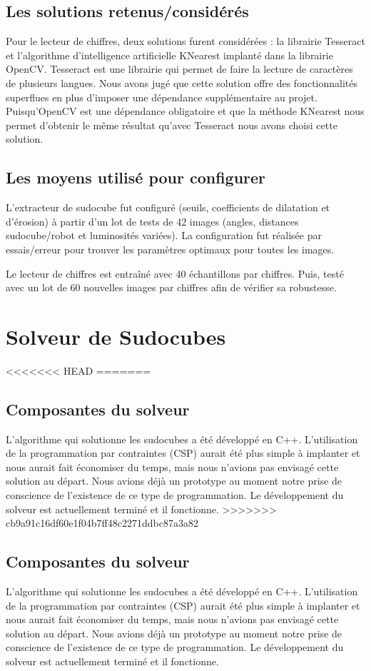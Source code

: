\subsection{Les solutions retenus/considérés}
Pour le lecteur de chiffres, deux solutions furent considérées : la librairie Tesseract et l'algorithme d'intelligence artificielle KNearest implanté dans la librairie OpenCV. Tesseract est une librairie qui permet de faire la lecture de caractères de plusieurs langues. Nous avons jugé que cette solution offre des fonctionnalités superflues en plus d'imposer une dépendance supplémentaire au projet. Puisqu’OpenCV est une dépendance obligatoire et que la méthode KNearest nous permet d'obtenir le même résultat qu'avec Tesseract nous avons choisi cette solution.

\subsection{Les moyens utilisé pour configurer}
L'extracteur de sudocube fut configuré (seuils, coefficients de dilatation et d'érosion) à partir d'un lot de tests de 42 images (angles, distances sudocube/robot et luminosités variées). La configuration fut réalisée par essais/erreur pour trouver les paramètres optimaux pour toutes les images.

Le lecteur de chiffres est entraîné avec 40 échantillons par chiffres. Puis, testé avec un lot de 60 nouvelles images par chiffres afin de vérifier sa robustesse.

\section{Solveur de Sudocubes}
<<<<<<< HEAD
=======
\subsection{Composantes du solveur}
L'algorithme qui solutionne les sudocubes a été développé en C++. L'utilisation de la programmation par contraintes (CSP) aurait été  plus simple à implanter et nous aurait fait économiser du temps, mais nous n'avions pas envisagé cette solution au départ. Nous avions déjà un prototype au moment notre prise de conscience de l'existence de ce type de programmation. Le développement du solveur est actuellement terminé et il fonctionne.
>>>>>>> cb9a91c16df60e1f04b7ff48c2271ddbc87a3a82

\subsection{Composantes du solveur}
L'algorithme qui solutionne les sudocubes a été développé en C++. L'utilisation de la programmation par contraintes (CSP) aurait été  plus simple à implanter et nous aurait fait économiser du temps, mais nous n'avions pas envisagé cette solution au départ. Nous avions déjà un prototype au moment notre prise de conscience de l'existence de ce type de programmation. Le développement du solveur est actuellement terminé et il fonctionne.


